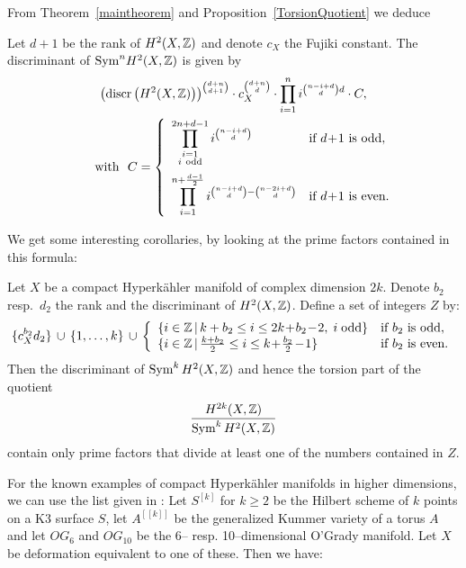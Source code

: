 From Theorem~\ref{maintheorem} and Proposition~\ref{TorsionQuotient} we deduce
\begin{theorem}\label{FujikiDiscr}
Let $d+1$ be the rank of $H^2(X,\mathbb{Z})$ and denote $c_X$ the Fujiki constant.
The discriminant of $\operatorname{Sym}^n\!H^2(X,\mathbb{Z})$ is given by
\begin{gather*}
\left(\discr \left(H^2(X,\Z)\right)\right)^{\binom{d+n}{d+1}}\cdot c_X^{\binom{d+n}{d}} \cdot \prod_{i=1}^n i^{\binom{n-i+d}{d}d} 
\cdot C, \\
\qquad \text{with } \ 
C=
\left\{
 \begin{array}{*2{l}p{5cm}}
 \displaystyle\prod_{\substack{i=1 \\ i\ \text{odd}\\\ }}^{2n+d-1}i^{\binom{n-i+d}{d}} &\text{if }d\!+\! 1\text{ is odd}, \\
 \displaystyle\prod_{i=1}^{n+\frac{d-1}{2}} i^{\binom{n-i+d}{d} - \binom{n-2i+d}{d}} &\text{if }d\! +\! 1\text{ is even}.
\end{array}
\right.
\end{gather*}
\end{theorem}
We get some interesting corollaries, by looking at the prime factors contained in this formula:
\begin{corollary}
Let $X$ be a compact Hyperk\"ahler manifold of complex dimension $2k$. Denote $b_2$ resp.~$d_2$ the rank and the discriminant of $H^2(X,\mathbb{Z})$. Define a set of integers $Z$ by:
$$
\{c_X^{b_2} d_2\} \,\cup\, \{1,\ldots ,k\} \,\cup\, \left\{
\begin{array}{*2{l}p{5cm}}
 \{i \in\Z\,|\,k+b_2 \leq i \leq 2k\!+\!b_2\!-\!2,\; i\; \text{odd}\}   &\text{if }b_2\text{ is odd}, \\
 \{i\in\Z \,|\, \frac{k+b_2}{2}\leq i \leq k\!+\!\frac{b_2}{2}\!-\!1\}   &\text{if }b_2\text{ is even}.
\end{array}
\right.
$$
Then the discriminant of $\operatorname{Sym}^kH^2(X,\mathbb{Z})$ and hence the torsion part of the quotient
$$
\frac{H^{2k}(X,\mathbb{Z})}{\operatorname{Sym}^kH^2(X,\mathbb{Z})}
$$
contain only prime factors that divide at least one of the numbers contained in $Z$.
\end{corollary}
For the known examples of compact Hyperk\"ahler manifolds in higher dimensions, we can use the list given in \cite[Table~1]{OGrady}:
Let $S^{[k]}$ for $k\geq 2$ be the Hilbert scheme of $k$ points on a K3 surface $S$, let $A^{[[k]]}$ be the generalized Kummer variety of a torus $A$ and let $OG_6$ and $OG_{10}$ be the 6-- resp. 10--dimensional O'Grady manifold. Let $X$ be deformation equivalent to one of these. Then we have:

